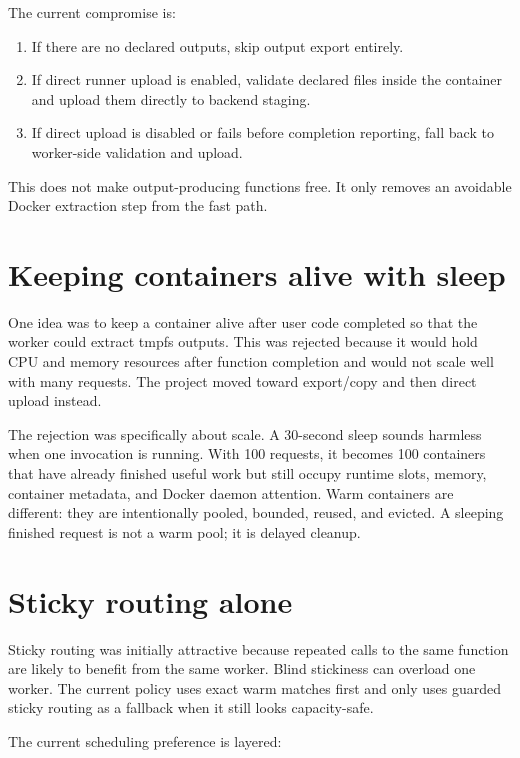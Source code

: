 \documentclass[12pt,a4paper]{report}
\begin{document}
The current compromise is:

\begin{enumerate}[leftmargin=1.2cm]
  \item If there are no declared outputs, skip output export entirely.
  \item If direct runner upload is enabled, validate declared files inside the container and upload them directly to backend staging.
  \item If direct upload is disabled or fails before completion reporting, fall back to worker-side validation and upload.
\end{enumerate}

This does not make output-producing functions free. It only removes an avoidable
Docker extraction step from the fast path.

\section{Keeping containers alive with sleep}

One idea was to keep a container alive after user code completed so that the
worker could extract tmpfs outputs. This was rejected because it would hold CPU
and memory resources after function completion and would not scale well with
many requests. The project moved toward export/copy and then direct upload
instead.

The rejection was specifically about scale. A 30-second sleep sounds harmless
when one invocation is running. With 100 requests, it becomes 100 containers
that have already finished useful work but still occupy runtime slots, memory,
container metadata, and Docker daemon attention. Warm containers are different:
they are intentionally pooled, bounded, reused, and evicted. A sleeping
finished request is not a warm pool; it is delayed cleanup.

\section{Sticky routing alone}

Sticky routing was initially attractive because repeated calls to the same
function are likely to benefit from the same worker. Blind stickiness can
overload one worker. The current policy uses exact warm matches first and only
uses guarded sticky routing as a fallback when it still looks capacity-safe.

The current scheduling preference is layered:
\end{document}
